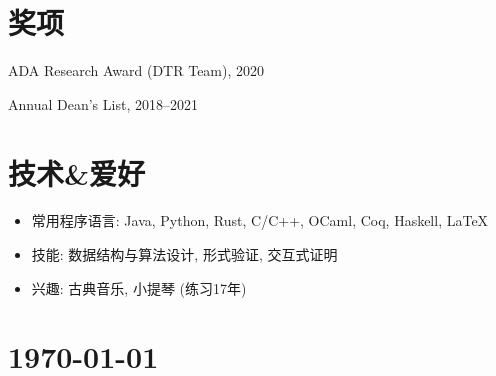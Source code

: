 \documentclass{article}
\begin{document}












\section*{奖项}
ADA Research Award (DTR Team), 2020

Annual Dean's List, 2018--2021

\section*{技术\&爱好}
\begin{itemize}
    \setlength{\itemsep}{1pt}
    \setlength{\parskip}{0pt}
    \setlength{\parsep}{0pt}
    \item 常用程序语言: Java, Python, Rust, C/C++, OCaml, Coq, Haskell, \LaTeX
    \item 技能: 数据结构与算法设计, 形式验证, 交互式证明
    \item 兴趣: 古典音乐, 小提琴 (练习17年)
\end{itemize}





\vfill

\section*{\hfill\color{OliveGreen}\today}
\end{document}
